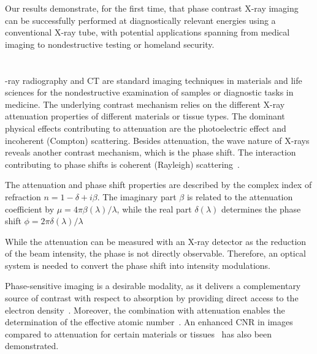 \documentclass{pnastwo}
\begin{document}
\begin{article}
Our results demonstrate, for the first time, that phase contrast X-ray
imaging can be successfully performed at diagnostically relevant energies
using a conventional X-ray tube, with potential applications spanning from
medical imaging to nondestructive testing or homeland security.

\section{}
-ray radiography and CT are standard imaging techniques in
materials and life sciences for the nondestructive examination of samples or
diagnostic tasks in medicine. The underlying contrast mechanism
relies on the different X-ray attenuation properties of different materials
or tissue types. The dominant physical effects contributing to attenuation
are the photoelectric effect and incoherent (Compton) scattering. Besides attenuation, the wave
nature of X-rays reveals another contrast mechanism, which is the phase
shift. The interaction contributing to phase shifts is coherent (Rayleigh)
scattering~\cite{Als-Nielsen2011}.

The attenuation and phase shift properties are described by the complex index of refraction
$n=1-\delta + i \beta$.
The imaginary part $\beta$ is related to the
attenuation coefficient by $\mu = 4 \pi
\beta(\lambda) / \lambda$, while the real part
$\delta(\lambda)$ determines the phase shift 
$\phi = 2 \pi \delta(\lambda) / \lambda$

While the attenuation can be measured with an
X-ray detector as the reduction of the beam intensity, the phase
is not directly observable. Therefore, an optical system is needed to
convert the phase shift into intensity modulations.

Phase-sensitive
imaging is a desirable modality, as it delivers a complementary source of
contrast with respect to absorption by providing direct access 
to the electron density~\cite{Als-Nielsen2011}. Moreover, the combination with
attenuation enables the determination of the effective atomic
number~\cite{Qi2010}.
An enhanced
CNR in images compared to attenuation for certain
materials or tissues~\cite{Pfeiffer2007a,McDonald2009} has also been
demonstrated.


\end{article}
\end{document}
